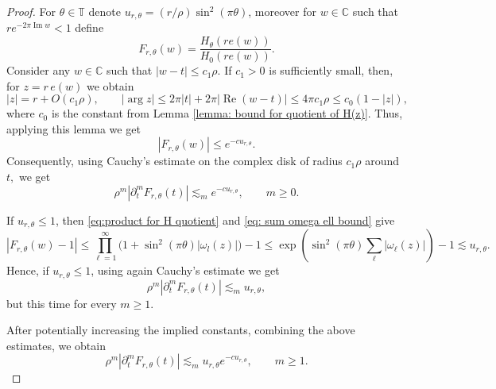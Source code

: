 \documentclass{article}
\newcommand{\C}{\mathbb C}
\newcommand{\T}{\mathbb T}
\theoremstyle{plain}
\numberwithin{equation}{section}
\begin{document}
\begin{proof}
   For $\theta \in \T$ denote \(u_{r,\theta}=(r/\rho)\sin^2(\pi\theta)\), moreover for \(w\in\mathbb C\) such
that \(re^{-2 \pi\operatorname{Im}w}<1\) define
\[
 F_{r,\theta}(w)=\frac{H_\theta(re(w))}{H_0(re(w))}.
\]
Consider any $w \in \C$ such that $|w-t| \le c_1 \rho$.
If $c_1>0$ is sufficiently small, then, for
$z=r\,e(w) $ we obtain
\[
 |z| = r+O(c_1 \rho), \qquad
 |\arg z|\leq 2\pi|t|+2\pi|\operatorname{Re}(w-t)|
 \leq 4\pi c_1\rho\leq c_0(1-|z|),
\]
where $c_0$ is the constant from Lemma \ref{lemma: bound for quotient of H(z)}.
Thus, applying this lemma we get
\begin{equation*}
 |F_{r,\theta}(w)|\leq e^{-cu_{r,\theta}}.
\end{equation*}
Consequently, using Cauchy's estimate on the complex disk of radius \(c_1\rho\) around $t,$ we get
\begin{equation}
\label{eq:euclidean-complex-F-decay}
 \rho^m|\partial_t^mF_{r,\theta}(t)|
 \lesssim_m e^{-cu_{r,\theta}},\qquad m\ge 0.
\end{equation}

If $u_{r,\theta}\leq1$, then \eqref{eq:product for H quotient} and \eqref{eq: sum omega ell bound} give
\[
 |F_{r,\theta}(w)-1|\le \prod_{\ell=1}^\infty\big(1+\sin^2(\pi \theta) |\omega_l(z) |\big)-1
 \leq\exp\left(\sin^2(\pi \theta)\sum_\ell|\omega_\ell(z)|\right)-1
 \lesssim u_{r,\theta}.
\]
Hence, if $u_{r, \theta} \le 1$, using again Cauchy's estimate we get
\[
 \rho^m|\partial_t^mF_{r,\theta}(t)|
 \lesssim_m u_{r,\theta},
\]
but this time for every $m\ge 1.$

  After potentially increasing the implied constants, combining the above estimates, we obtain
\begin{equation}\label{eq:euclidean-one-coordinate-derivative}
 \rho^m|\partial_t^mF_{r,\theta}(t)|
 \lesssim_m u_{r,\theta}e^{-c u_{r,\theta}},\qquad m\ge 1.
\end{equation}


\end{proof}
\end{document}
